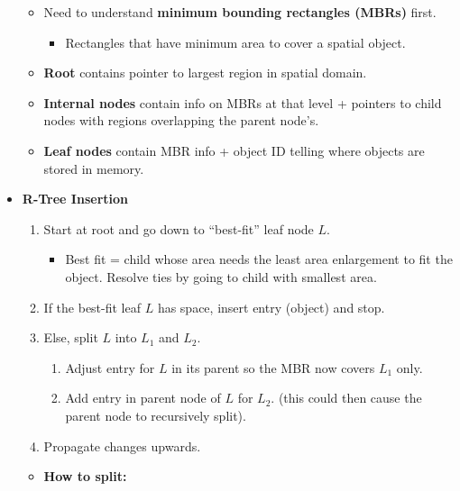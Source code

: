 \begin{multicols}{2}
\begin{itemize}
  \begin{itemize}
    \item
    Need to understand \textbf{minimum bounding rectangles (MBRs)}
    first.

    \begin{itemize}
        \item
      Rectangles that have minimum area to cover a spatial object.
    \end{itemize}
  \item
    \textbf{Root} contains pointer to largest region in spatial domain.
  \item
    \textbf{Internal nodes} contain info on MBRs at that level +
    pointers to child nodes with regions overlapping the parent node's.
  \item
    \textbf{Leaf nodes} contain MBR info + object ID telling where
    objects are stored in memory.
  \end{itemize}
\item
  \textbf{R-Tree Insertion}

  \begin{enumerate}
  \def\labelenumi{\arabic{enumi}.}
    \item
    Start at root and go down to ``best-fit'' leaf node \(L\).

    \begin{itemize}
        \item
      Best fit = child whose area needs the least area enlargement to
      fit the object. Resolve ties by going to child with smallest area.
    \end{itemize}
  \item
    If the best-fit leaf \(L\) has space, insert entry (object) and
    stop.
  \item
    Else, split \(L\) into \(L_{1}\) and \(L_{2}\).

    \begin{enumerate}
    \def\labelenumii{\arabic{enumii}.}
        \item
      Adjust entry for \(L\) in its parent so the MBR now covers
      \(L_{1}\) only.
    \item
      Add entry in parent node of \(L\) for \(L_{2}\). (this could then
      cause the parent node to recursively split).
    \end{enumerate}
  \item
    Propagate changes upwards.
  \end{enumerate}

  \begin{itemize}
    \item
    \textbf{How to split:}


\end{itemize}
\end{itemize}
\end{multicols}
